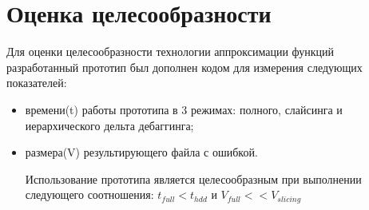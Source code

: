 \section{Оценка целесообразности}
Для оценки целесообразности технологии аппроксимации функ­ций разработанный прототип был дополнен кодом для измерения следующих показателей:
\begin{itemize}
	\item времени(t) работы прототипа в 3 режимах: полного, слайсинга и иерархического дельта дебаггинга;
	\item размера(V) результирующего файла с ошибкой.
	
Использование прототипа является целесообразным при выполнении следующего соотношения: $t_{full} < t_{hdd}$ и $V_{full} << V_{slicing}$
\end{itemize}


